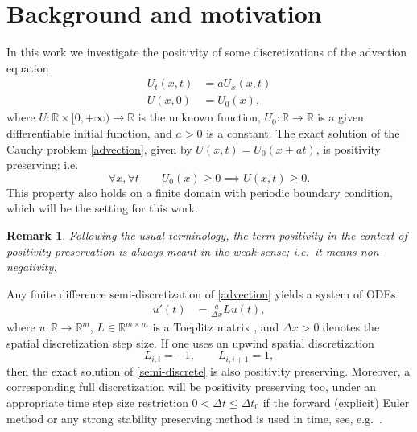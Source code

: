 \documentclass[a4paper]{article}
\newtheorem{remark}{Remark}
\newcommand{\dt}{\Delta t}
\newcommand{\dx}{\Delta x}
\begin{document}
\section{Background and motivation}
In this work we investigate the positivity of some discretizations of the advection equation
\begin{subequations} \label{advection}
\begin{align}
U_t (x,t)& = a U_x(x,t) \\
U(x,0) & = U_0(x),
\end{align}
\end{subequations}
where $U:\mathbb{R}\times [0,+\infty)\to\mathbb{R}$ is the unknown function, $U_0:\mathbb{R}\to\mathbb{R}$ is a given differentiable initial function, and $a>0$ is a constant. 
The exact solution of the Cauchy problem \eqref{advection}, given by $U(x,t) =
U_0(x+a t)$, is positivity preserving; i.e.
\[
\forall x, \forall t\quad\quad U_0(x) \ge 0 \implies U(x,t) \ge 0.
\]
This property also holds on a finite domain with periodic boundary
condition, which will be the setting for this work. 

\begin{remark}
Following the usual terminology, the term {\emph{positivity}} in the context of {positivity preservation} is always meant in the weak sense; i.e.~it means {\emph{non-negativity}}. 
\end{remark}


Any finite difference semi-discretization of \eqref{advection} yields a system of ODEs
\begin{align} \label{semi-discrete}
    u'(t) & = \frac{a}{\dx}Lu(t),
\end{align}
where $u:\mathbb{R}\to\mathbb{R}^m$, $L\in\mathbb{R}^{m\times m}$ is a Toeplitz matrix \cite[Section 3.1]{matmat}, and $\dx>0$ denotes the spatial discretization step size.  
If one uses an upwind spatial discretization
\[
    L_{i,i}  = -1,\quad\quad L_{i,i+1} =  1,
\]
 then the exact solution of \eqref{semi-discrete} is also positivity
preserving. Moreover, a corresponding full discretization will be positivity preserving too,
under an appropriate time step size restriction $0<\dt\le\dt_0$
if the forward (explicit) Euler method or any strong stability preserving
method \cite{SSPbook} is used in time, see, e.g.~\cite{posconv}.  
\end{document}
